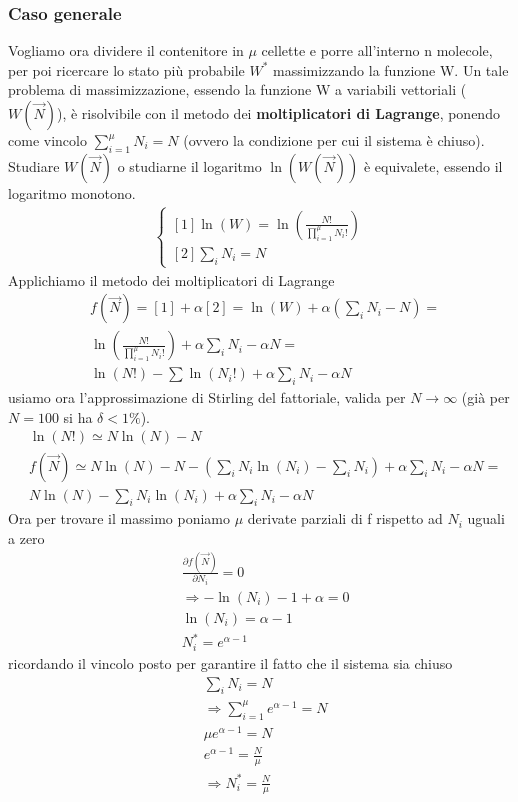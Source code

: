 \documentclass[
10pt, %
a4paper, %
oneside, %
headinclude,footinclude, %
BCOR5mm, %
]{scrartcl}
\begin{document}
\subsubsection*{Caso generale}
Vogliamo ora dividere il contenitore in $\mu$ cellette e porre all'interno n molecole, per poi ricercare lo stato più probabile \(W^*\) massimizzando la funzione W. Un tale problema di massimizzazione, essendo la funzione W a variabili vettoriali (\(W(\vec{N})\)), è risolvibile con il metodo dei \textbf{moltiplicatori di Lagrange}, ponendo come vincolo \(\sum_{i=1}^{\mu}N_i = N\) (ovvero la condizione per cui il sistema è chiuso).\\
Studiare \(W(\vec{N})\) o studiarne il logaritmo \(\ln(W(\vec{N}))\) è equivalete, essendo il logaritmo monotono. 
\begin{align*}
	\begin{cases}
		[1]\ln(W)=\ln\left(\frac{N!}{\prod_{i=1}^\mu N_i!}\right)\\
		[2]\sum_i N_i = N
	\end{cases}
\end{align*}
Applichiamo il metodo dei moltiplicatori di Lagrange
\begin{align*}
	&f(\vec{N})=[1]+\alpha[2]=\ln(W)+\alpha(\sum_iN_i -N)=\\
	&\ln\left(\frac{N!}{\prod_{i=1}^{\mu}N_i!}\right)+\alpha\sum_iN_i-\alpha N=\\
	&\ln(N!)-\sum\ln(N_i!)+\alpha \sum_i N_i -\alpha N
\end{align*}
usiamo ora l'approssimazione di Stirling del fattoriale, valida per \(N\to\infty\) (già per \(N=100\) si ha \(\delta < 1\%\)). 
\begin{align*}
	&\ln(N!)\simeq N \ln(N)-N\\
	&f(\vec{N})\simeq N\ln(N)-N-(\sum_iN_i\ln(N_i)-\sum_iN_i)+\alpha\sum_iN_i-\alpha N=\\
	&N\ln(N)-\sum_iN_i\ln(N_i)+\alpha\sum_iN_i-\alpha N
\end{align*}
Ora per trovare il massimo poniamo $\mu$ derivate parziali di f rispetto ad \(N_i\) uguali a zero 
\begin{align*}
	&\frac{\partial f(\vec{N})}{\partial N_i}=0\\
	&\Rightarrow -\ln(N_i)-1+\alpha =0\\
	&\ln(N_i) = \alpha - 1\\
	&N_i^* = e^{\alpha - 1}
\end{align*}
ricordando il vincolo posto per garantire il fatto che il sistema sia chiuso
\begin{align*}
	&\sum_iN_i =N\\
	&\Rightarrow \sum_{i=1}^{\mu}e^{\alpha - 1}=N\\
	&\mu e^{\alpha -1}=N\\
	&e^{\alpha - 1}=\frac{N}{\mu}\\
	&\Rightarrow N_i^* = \frac{N}{\mu}
\end{align*}
\end{document}
